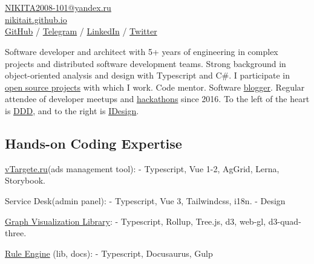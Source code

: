 \documentclass{yb}
\begin{document}
\ybPrintPhoto{}

\section*{\Large {}}

\href{mailto:NIKITA2008-101@yandex.ru}{NIKITA2008-101@yandex.ru}\\%
\href{https://nikitait.github.io/}{nikitait.github.io}\\%
\href{https://github.com/nikitait}{GitHub} /
\href{https://t.me/NonNikita}{Telegram} /
\href{https://www.linkedin.com/in/nikita-fedorov-041243126}{LinkedIn} /
\href{https://twitter.com/intent/follow?screen_name=Nikita_Fiodorov}{Twitter}
\vspace*{12pt}

Software developer and architect with
5+ years of engineering in complex projects and distributed software
development teams. Strong background in object-oriented analysis and design
with Typescript and C\#. I participate in \href{https://github.com/nikitait}{open source projects} with which I work. Code mentor. Software
\href{https://nikitait.github.io}{blogger}. Regular attendee of developer meetups and \href{https://www.youtube.com/watch?v=gVKDU043EWI&t=1s&ab_channel=EPAMSaint-Petersburg}{hackathons} since 2016. To the left of the heart is \href{https://github.com/ddd-crew}{DDD}, and to the right is \href{https://www.idesign.net/}{IDesign}.


\subsection*{Hands-on Coding Expertise}

\href{https://vtargete.ru/}{vTargete.ru}(ads management tool): 
\newline - Typescript, Vue 1-2, AgGrid, Lerna, Storybook.

Service Desk(admin panel): 
\newline - Typescript, Vue 3, Tailwindcss, i18n.
\newline - Design

\href{https://baltinfocom.ru/BigData\#en}{Graph Visualization Library}:
\newline - Typescript, Rollup, Tree.js, d3, web-gl, d3-quad-three.

\href{https://nikitait.github.io/nools-ts/docs/}{Rule Engine} (lib, docs):
\newline - Typescript, Docusaurus, Gulp
\end{document}
